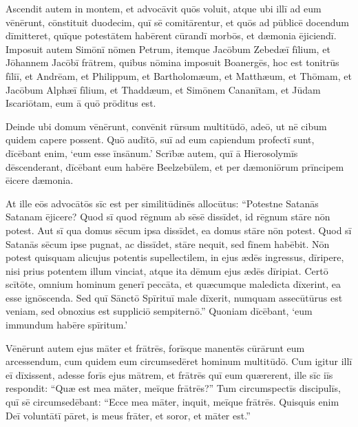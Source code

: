 \Versus Ascendit autem in montem, et advocāvit quōs voluit, atque ubi illī ad eum vēnērunt,
\Versus cōnstituit duodecim, quī sē comitārentur, et quōs ad pūblicē docendum dīmitteret,
\Versus quīque potestātem habērent cūrandī morbōs, et dæmonia ējiciendī.
\Versus Imposuit autem Simōnī nōmen Petrum,
\Versus itemque Jacōbum Zebedæī fīlium, et Jōhannem Jacōbī frātrem, quibus nōmina imposuit Boanergēs, hoc est tonitrūs fīliī,
\Versus et Andrēam, et Philippum, et Bartholomæum, et Matthæum, et Thōmam, et Jacōbum Alphæī fīlium, et Thaddæum, et Simōnem Cananītam,
\Versus et Jūdam Iscariōtam, eum ā quō prōditus est.

\Versus Deinde ubi domum vēnērunt, convēnit rūrsum multitūdō, adeō, ut nē cibum quidem capere possent.
\Versus Quō audītō, suī ad eum capiendum profectī sunt, dīcēbant enim, `eum esse īnsānum.'
\Versus Scrībæ autem, quī ā Hierosolymīs dēscenderant, dīcēbant eum habēre Beelzebūlem, et per dæmoniōrum prīncipem ēicere dæmonia.

\Versus At ille eōs advocātōs sīc est per similitūdinēs allocūtus: ``Potestne Satanās Satanam ējicere?
\Versus Quod sī quod rēgnum ab sēsē dissīdet, id rēgnum stāre nōn potest.
\Versus Aut sī qua domus sēcum ipsa dissīdet, ea domus stāre nōn potest.
\Versus Quod sī Satanās sēcum ipse pugnat, ac dissīdet, stāre nequit, sed fīnem habēbit.
\Versus Nōn potest quisquam alicujus potentis supellectilem, in ejus ædēs ingressus, dīripere, nisi prius potentem illum vinciat, atque ita dēmum ejus ædēs dīripiat.
\Versus Certō scītōte, omnium hominum generī peccāta, et quæcumque maledicta dīxerint, ea esse ignōscenda.
\Versus Sed quī Sānctō Spīrituī male dīxerit, numquam assecūtūrus est veniam, sed obnoxius est suppliciō sempiternō.''
\Versus Quoniam dīcēbant, `eum immundum habēre spīritum.'

\Versus Vēnērunt autem ejus māter et frātrēs, forīsque manentēs cūrārunt eum arcessendum,
\Versus cum quidem eum circumsedēret hominum multitūdō. Cum igitur illī eī dīxissent, adesse forīs ejus mātrem, et frātrēs quī eum quærerent,
\Versus ille sīc iīs respondit: ``Quæ est mea māter, meīque frātrēs?''
\Versus Tum circumspectīs discipulīs, quī sē circumsedēbant: ``Ecce mea māter, inquit, meīque frātrēs.
\Versus Quisquis enim Deī voluntātī pāret, is meus frāter, et soror, et māter est.''
